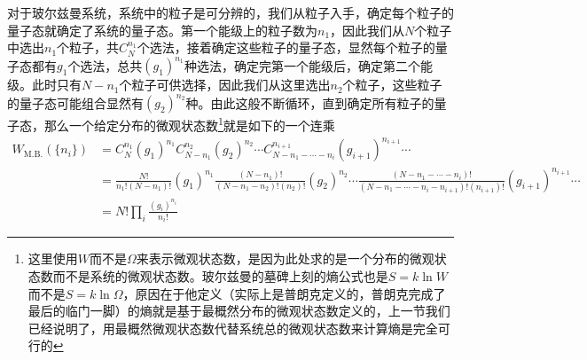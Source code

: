 \documentclass[../../main.tex]{subfiles}
\begin{document}
对于玻尔兹曼系统，系统中的粒子是可分辨的，我们从粒子入手，确定每个粒子的量子态就确定了系统的量子态。第一个能级上的粒子数为\(n_1\)，因此我们从\(N\)个粒子中选出\(n_1\)个粒子，共\(C_N^{n_1}\)个选法，接着确定这些粒子的量子态，显然每个粒子的量子态都有\(g_1\)个选法，总共\((g_1)^{n_1}\)种选法，确定完第一个能级后，确定第二个能级。此时只有\(N-n_1\)个粒子可供选择，因此我们从这里选出\(n_2\)个粒子，这些粒子的量子态可能组合显然有\((g_2)^{n_2}\)种。由此这般不断循环，直到确定所有粒子的量子态，那么一个给定分布的微观状态数\footnote{这里使用\(W\)而不是\(\Omega\)来表示微观状态数，是因为此处求的是一个分布的微观状态数而不是系统的微观状态数。玻尔兹曼的墓碑上刻的熵公式也是\(S=k\ln W\)而不是\(S=k\ln\Omega\)，原因在于他定义（实际上是普朗克定义的，普朗克完成了最后的临门一脚）的熵就是基于最概然分布的微观状态数定义的，上一节我们已经说明了，用最概然微观状态数代替系统总的微观状态数来计算熵是完全可行的}就是如下的一个连乘
\begin{equation}
    \begin{split}
        W_{\mathrm{M.B.}}\left(\{n_i\}\right)&=C_N^{n_1}(g_1)^{n_1}C_{N-n_1}^{n_2}(g_2)^{n_2}\cdots C_{N-n_1-\cdots -n_i}^{n_{i+1}}(g_{i+1})^{n_{i+1}}\cdots \\
        &=\frac{N!}{n_1 !(N-n_1)!}(g_1)^{n_1}\frac{(N-n_1)!}{(N-n_1-n_2)!(n_2)!}(g_2)^{n_2}\cdots \frac{(N-n_1-\cdots -n_i)!}{(N-n_1-\cdots -n_i-n_{i+1})!(n_{i+1})!}(g_{i+1})^{n_{i+1}}\cdots \\
        &=N!\prod_i\frac{(g_i)^{n_i}}{n_i !}
    \end{split}
\end{equation}
\end{document}
